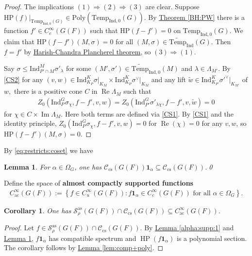 \documentclass[10pt]{amsart}
\newtheorem{corollary}{Corollary}[theorem]
\newtheorem{lemma}[theorem]{Lemma}
\theoremstyle{definition}
\numberwithin{equation}{section}
\numberwithin{equation}{subsection}
\newcommand{\Ind}{\mathrm{Ind}}
\newcommand{\Temp}{\mathrm{Temp}}
\renewcommand{\Im}{\mathop{\mathrm{Im}}}
\renewcommand{\Re}{\mathop{\mathrm{Re}}}
\newcommand{\HP}{\mathop{\mathrm{HP}}\nolimits}
\begin{document}
\begin{proof}
    The implications $(1)\Rightarrow (2)\Rightarrow (3)$ are clear. Suppose $\mathrm{HP}(f)\vert_{\Temp_{\Ind,0}(G)}\in  \mathrm{Poly}(\Temp_{\Ind,0}(G)).$ By \hyperref[BH:PW]{Theorem \ref{BH:PW}} there is a function $f'\in C^\infty_c(G(F))$ such that $\mathrm{HP}(f-f')=0$ on $\Temp_{\Ind,0}(G)$. We claim that   $\mathrm{HP}(f-f')(M,\sigma)=0$ for all $(M,\sigma)\in \widetilde{\mathrm{Temp}}_{\Ind}(G).$  Then $f=f'$ by \hyperref[HCPlan]{Harish-Chandra Plancherel theorem}, so $(3)\Rightarrow(1)$.

    Say $\sigma\le \mathrm{Ind}_{P'\cap M}^{M} \sigma'_{\lambda}$ for some $(M',\sigma')\in \widetilde{\mathrm{Temp}}_{\mathrm{Ind,0}}(M)$ and $\lambda\in \Lambda_{M'}.$ By \eqref{CS2} for any $(v,w)\in \Ind_{K_P}^K\sigma\vert_{K_M}\times \Ind_{K_P}^K\sigma^\vee\vert_{K_M}$ and any lift $\tilde{w}\in \mathrm{Ind}_{K_{P'}}^{K}\sigma'^\lor|_{K_{M'}}$ of $w,$ there is a positive cone $C$ in $\Re\Lambda_M$ such that
    \begin{align*}
         Z_0(\mathrm{Ind}_P^G \sigma_{\chi}, f-f',v,w)=Z_0(\mathrm{Ind}_{P'}^G \sigma'_{\lambda\chi}, f-f',v,\tilde{w})=0
    \end{align*}
     for  $\chi\in C\times \Im \Lambda_M$. Here both terms are defined via \eqref{CS1}. By \eqref{CS1} and the identity principle,  $Z_0(\mathrm{Ind}_P^G \sigma_{\chi}, f-f',v,w)=0$ for $\Re(\chi)=0$ for any $v,w$, so $\mathrm{HP}(f-f')(M,\sigma)=0.$
\end{proof}

By \eqref{eq:restricts:coset} we have

\begin{lemma}\label{Ccs:onealpha:stable} For $\alpha\in\Omega_G$, one has $\mathcal{C}_{\mathrm{cs}}(G(F))\mathbf{1}_\alpha\subseteq \mathcal{C}_{\mathrm{cs}}(G(F))$.\qed
\end{lemma}



Define the space of \textbf{almost compactly supported functions} 
\begin{align}\label{eq:ac}
    C_{\mathrm{ac}}^\infty(G(F)) := \left\{f\in C_u^\infty(G(F)) : f\mathbf{1}_\alpha\in C_c^\infty(G(F))\text{ for all }\alpha\in \Omega_G\right\}.
\end{align}

\begin{corollary}\label{Sas+csisac} One has $\mathcal{S}_\rho^{\mathrm{as}}(G(F))\cap \mathcal{C}_{\mathrm{cs}}(G(F))\subseteq C_{\mathrm{ac}}^\infty(G(F))$.
\end{corollary}
\begin{proof} Let $f\in \mathcal{S}_\rho^{\mathrm{as}}(G(F))\cap \mathcal{C}_{\mathrm{cs}}(G(F))$. By \hyperref[alpha:supp:1]{Lemma \ref{alpha:supp:1}} and \hyperref[Ccs:onealpha:stable]{Lemma \ref{Ccs:onealpha:stable}},  $f\mathbf{1}_\alpha$ has compatible spectrum and $\HP(f\mathbf{1}_\alpha)$ is a polynomial section. The corollary follows by \hyperref[lem:comp+poly]{Lemma \ref{lem:comp+poly}}.
\end{proof}
\end{document}
